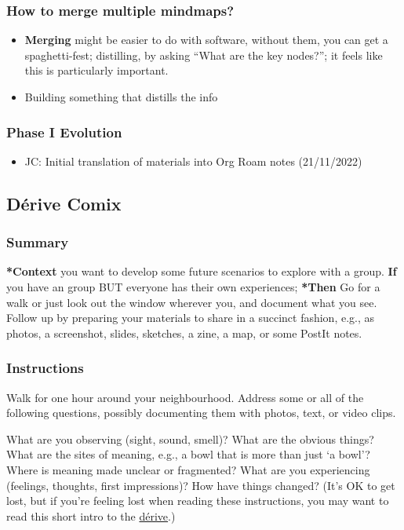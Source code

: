 \documentclass[11pt]{article}
\begin{document}
\subsubsection{How to merge multiple mindmaps?}
\label{sec:org5ef4ea9}
\begin{itemize}
\item \textbf{Merging} might be easier to do with software, without them, you can get a spaghetti-fest; distilling, by asking ``What are the key nodes?''; it feels like this is particularly important.
\item Building something that distills the info
\end{itemize}

\subsubsection{Phase I Evolution}
\label{sec:orga7380f4}

\begin{itemize}
\item JC: Initial translation of materials into Org Roam notes (21/11/2022)
\end{itemize}
\subsection{Dérive Comix}
\label{615846a2-1795-40b4-8dfb-3e12923fccc0}
\subsubsection{Summary}
\label{sec:org72ecb42}

\textbf{*Context} you want to develop some future scenarios to explore with a
group. \textbf{If} you have an group BUT everyone has their own experiences;
\textbf{*Then} Go for a walk or just look out the window wherever you, and
document what you see. Follow up by preparing your materials to share in
a succinct fashion, e.g., as photos, a screenshot, slides, sketches, a
zine, a map, or some PostIt notes.

\subsubsection{Instructions}
\label{sec:orgaaafe98}

Walk for one hour around your neighbourhood.  Address some or all of
the following questions, possibly documenting them with photos, text,
or video clips.

What are you observing (sight, sound, smell)?  What are the obvious
things?  What are the sites of meaning, e.g., a bowl that is more than
just ‘a bowl’?  Where is meaning made unclear or fragmented?  What are
you experiencing (feelings, thoughts, first impressions)?  How have
things changed?  (It’s OK to get lost, but if you’re feeling lost when
reading these instructions, you may want to read this short intro to
the \href{https://www.publicstreet.org/derive}{dérive}.)
\end{document}
